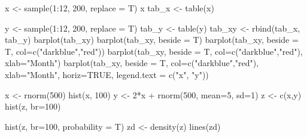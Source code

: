 \documentclass[
]{book}
\newenvironment{Shaded}{\begin{snugshade}}{\end{snugshade}}
\newcommand{\AttributeTok}[1]{\textcolor[rgb]{0.77,0.63,0.00}{#1}}
\newcommand{\ConstantTok}[1]{\textcolor[rgb]{0.00,0.00,0.00}{#1}}
\newcommand{\DecValTok}[1]{\textcolor[rgb]{0.00,0.00,0.81}{#1}}
\newcommand{\FunctionTok}[1]{\textcolor[rgb]{0.00,0.00,0.00}{#1}}
\newcommand{\NormalTok}[1]{#1}
\newcommand{\OtherTok}[1]{\textcolor[rgb]{0.56,0.35,0.01}{#1}}
\newcommand{\SpecialCharTok}[1]{\textcolor[rgb]{0.00,0.00,0.00}{#1}}
\newcommand{\StringTok}[1]{\textcolor[rgb]{0.31,0.60,0.02}{#1}}
\begin{document}
\begin{Shaded}
\begin{Highlighting}[]
\NormalTok{x }\OtherTok{\textless{}{-}} \FunctionTok{sample}\NormalTok{(}\DecValTok{1}\SpecialCharTok{:}\DecValTok{12}\NormalTok{, }\DecValTok{200}\NormalTok{, }\AttributeTok{replace =}\NormalTok{ T)}
\NormalTok{x}
\NormalTok{tab\_x }\OtherTok{\textless{}{-}} \FunctionTok{table}\NormalTok{(x)}


\NormalTok{y }\OtherTok{\textless{}{-}} \FunctionTok{sample}\NormalTok{(}\DecValTok{1}\SpecialCharTok{:}\DecValTok{12}\NormalTok{, }\DecValTok{200}\NormalTok{, }\AttributeTok{replace =}\NormalTok{ T)}
\NormalTok{tab\_y }\OtherTok{\textless{}{-}} \FunctionTok{table}\NormalTok{(y)}
\NormalTok{tab\_xy }\OtherTok{\textless{}{-}} \FunctionTok{rbind}\NormalTok{(tab\_x, tab\_y)}
\FunctionTok{barplot}\NormalTok{(tab\_xy)}
\FunctionTok{barplot}\NormalTok{(tab\_xy, }\AttributeTok{beside =}\NormalTok{ T)}
\FunctionTok{barplot}\NormalTok{(tab\_xy, }\AttributeTok{beside =}\NormalTok{ T, }\AttributeTok{col=}\FunctionTok{c}\NormalTok{(}\StringTok{"darkblue"}\NormalTok{,}\StringTok{"red"}\NormalTok{))}
\FunctionTok{barplot}\NormalTok{(tab\_xy, }\AttributeTok{beside =}\NormalTok{ T, }\AttributeTok{col=}\FunctionTok{c}\NormalTok{(}\StringTok{"darkblue"}\NormalTok{,}\StringTok{"red"}\NormalTok{), }\AttributeTok{xlab=}\StringTok{"Month"}\NormalTok{)}
\FunctionTok{barplot}\NormalTok{(tab\_xy, }\AttributeTok{beside =}\NormalTok{ T, }\AttributeTok{col=}\FunctionTok{c}\NormalTok{(}\StringTok{"darkblue"}\NormalTok{,}\StringTok{"red"}\NormalTok{), }\AttributeTok{xlab=}\StringTok{"Month"}\NormalTok{, }\AttributeTok{horiz=}\ConstantTok{TRUE}\NormalTok{, }\AttributeTok{legend.text =} \FunctionTok{c}\NormalTok{(}\StringTok{"x"}\NormalTok{, }\StringTok{"y"}\NormalTok{))}
\end{Highlighting}
\end{Shaded}

\begin{Shaded}
\begin{Highlighting}[]
\NormalTok{x }\OtherTok{\textless{}{-}} \FunctionTok{rnorm}\NormalTok{(}\DecValTok{500}\NormalTok{)}
\FunctionTok{hist}\NormalTok{(x, }\DecValTok{100}\NormalTok{)}
\NormalTok{y }\OtherTok{\textless{}{-}} \DecValTok{2}\SpecialCharTok{*}\NormalTok{x }\SpecialCharTok{+} \FunctionTok{rnorm}\NormalTok{(}\DecValTok{500}\NormalTok{, }\AttributeTok{mean=}\DecValTok{5}\NormalTok{, }\AttributeTok{sd=}\DecValTok{1}\NormalTok{)}
\NormalTok{z }\OtherTok{\textless{}{-}} \FunctionTok{c}\NormalTok{(x,y)}
\FunctionTok{hist}\NormalTok{(z, }\AttributeTok{br=}\DecValTok{100}\NormalTok{)}


\FunctionTok{hist}\NormalTok{(z, }\AttributeTok{br=}\DecValTok{100}\NormalTok{, }\AttributeTok{probability =}\NormalTok{ T)}
\NormalTok{zd }\OtherTok{\textless{}{-}} \FunctionTok{density}\NormalTok{(z)}
\FunctionTok{lines}\NormalTok{(zd)}
\end{Highlighting}
\end{Shaded}
\end{document}
